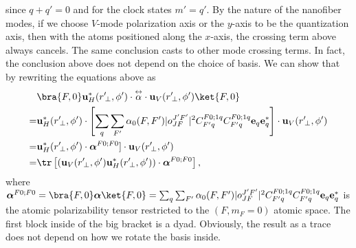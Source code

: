 \documentclass[]{report}
\newcommand{\tensor}[1]{\overset{\leftrightarrow}{#1}} %
\begin{document}
since $q+q' = 0$ and for the clock states $m' = q'$. By the nature of the nanofiber modes, if we choose 
$V$-mode polarization axis or the $y$-axis to be the quantization axis, then with the atoms positioned 
along the $x$-axis, the crossing term above always cancels. The same conclusion casts to other mode crossing 
terms. In fact, the conclusion above does not depend on the choice of basis. We can show that by 
rewriting the equations above as
\begin{align}
&\bra{F,0} \mathbf{u}^*_H(r^\prime\!_\perp, \phi') \cdot \tensor{\alpha} \cdot 
	\mathbf{u}_{V}(r^\prime\!_\perp, \phi') \ket{F,0}\nonumber\\
=& \mathbf{u}^*_H(r^\prime\!_\perp, 
 \phi')\cdot \left[  \sum_{q} \sum_{F'}\alpha_0(F,F') 
   |o^{J'F'}_{JF} |^2 C^{F 	0;1q}_{F' q} C^{F 0;1q}_{F' q}
     	  \mathbf{e}_q \mathbf{e}^*_{q}  \right]\cdot \mathbf{u}_V(r^\prime\!_\perp, \phi') \\
=& \mathbf{u}^*_H(r^\prime\!_\perp,  \phi')\cdot \boldsymbol{\alpha}^{F0;F0}]\cdot 
\mathbf{u}_V(r^\prime\!_\perp, \phi') \\
=& \tr\left[ \left(  \mathbf{u}_V(r^\prime\!_\perp, \phi')  \mathbf{u}^*_H(r^\prime\!_\perp,  \phi')\right)
\cdot  \boldsymbol{\alpha}^{F0;F0} \right],
\end{align}
where $  \boldsymbol{\alpha}^{F0;F0} = \bra{F,0}\boldsymbol{\alpha}\ket{F,0} = \sum_{q} 
\sum_{F'}\alpha_0(F,F') 
   |o^{J'F'}_{JF} |^2 C^{F 	0;1q}_{F' q} C^{F 0;1q}_{F' q}
     	  \mathbf{e}_q \mathbf{e}^*_{q} $ is the atomic 
polarizability tensor restricted to the $ (F,m_F=0) $ atomic space. The first block inside of the big bracket 
is a dyad. Obviously, the result as a trace does not depend on how we rotate the basis inside. 
 
\end{document}
